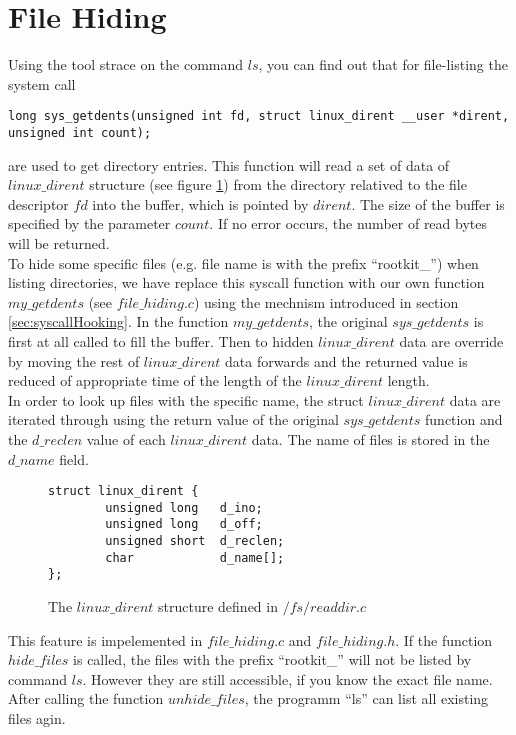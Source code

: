 \section{File Hiding}
Using the tool strace on the command $ls$, you can find out that for file-listing the system call 
\begin{center}
\lstset{escapechar=,style=customc}
\begin{lstlisting}
long sys_getdents(unsigned int fd, struct linux_dirent __user *dirent, unsigned int count);
\end{lstlisting}
\end{center}
are used to get directory entries. This function will read a set of data of $linux\_dirent$ structure (see figure \ref{ls:dirent}) from the directory relatived to the file descriptor $fd$ into the buffer, which is pointed by $dirent$. The size of the buffer is specified by the parameter $count$. If no error occurs, the number of read bytes will be returned.\\
To hide some specific files (e.g. file name is with the prefix ``rootkit\_'') when listing directories, we have replace this syscall function with our own function $my\_getdents$ (see $file\_hiding.c$) using the mechnism introduced in section \ref{sec:syscallHooking}. In the function $my\_getdents$, the original $sys\_getdents$ is first at all called to fill the buffer. Then to hidden $linux\_dirent$ data are override by moving the rest of $linux\_dirent$ data forwards and the returned value is reduced of appropriate time of the length of the $linux\_dirent$ length.\\ 
In order to look up files with the specific name, the struct $linux\_dirent$ data are iterated through using the return value of the original $sys\_getdents$ function and the $d\_reclen$ value of each $linux\_dirent$ data. The name of files is stored in the $d\_name$ field. 
\begin{center}
\begin{figure}
\lstset{escapechar=,style=customc}
\begin{lstlisting}
struct linux_dirent {
        unsigned long   d_ino;
        unsigned long   d_off;
        unsigned short  d_reclen;
        char            d_name[];
};
\end{lstlisting}
\caption{The $linux\_dirent$ structure defined in $/fs/readdir.c$}
\label{ls:dirent}
\end{figure}
\end{center}
This feature is impelemented in $file\_hiding.c$ and $file\_hiding.h$. If the function $hide\_files$ is called, the files with the prefix ``rootkit\_'' will not be listed by command $ls$. However they are still accessible, if you know the exact file name. After calling the function $unhide\_files$, the programm ``ls'' can list all existing files agin. 
